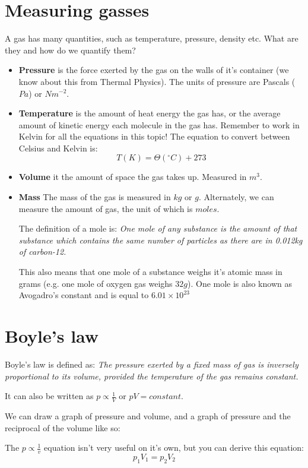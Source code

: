 \documentclass{article}
\begin{document}
\section*{Measuring gasses}
A gas has many quantities, such as temperature, pressure, density etc. What are
they and how do we quantify them?

\begin{itemize}
	\item \textbf{Pressure} is the force exerted by the gas on the walls of it's
	container (we know about this from Thermal Physics). The units of pressure
	are Pascals ($Pa$) or $Nm^{-2}$.
	\item \textbf{Temperature} is the amount of heat energy the gas has, or the
	average amount of kinetic energy each molecule in the gas has. Remember to
	work in Kelvin for all the equations in this topic! The equation to convert
	between Celsius and Kelvin is: 
	\[
		T(K) = \Theta(^\circ C) + 273
	\]
	\item \textbf{Volume} it the amount of space the gas takes up. Measured in
	$m^3$.
	\item \textbf{Mass} The mass of the gas is measured in $kg$ or $g$.
	Alternately, we can measure the amount of gas, the unit of which is $moles$.
	
	The definition of a mole is: \textit{One mole of any substance is the amount
	of that substance which contains the same number of particles as there are
	in 0.012kg of carbon-12.}
	
	This also means that one mole of a substance weighs it's atomic mass in
	grams (e.g. one mole of oxygen gas weighs $32g$). One mole is also known as
	Avogadro's constant and is equal to $6.01 \times 10^{23}$
\end{itemize}

\section*{Boyle's law}
Boyle's law is defined as: \textit{The pressure exerted by a fixed mass of gas
is inversely proportional to its volume, provided the temperature of the gas
remains constant.}

It can also be written as $p \propto \frac{1}{V}$ or $pV = constant$.

We can draw a graph of pressure and volume, and a graph of pressure and the
reciprocal of the volume like so:
\begin{center}
\end{center}
The $p \propto \frac{1}{v}$ equation isn't very useful on it's own, but you can derive this equation:
\[
	p_1V_1 = p_2V_2
\]
\end{document}
